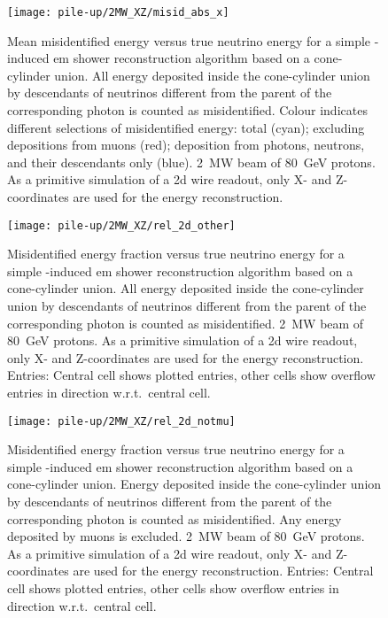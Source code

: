\begin{figure}[tbp]
	\centering
	\texttt{[image: pile-up/2MW\_XZ/misid\_abs\_x]}
	\caption[Pile-up study mean misidentified vs.\ true neutrino energy, \SI{2}{\mega\watt} beam, XZ projection]{%
		Mean misidentified energy versus true neutrino energy for a simple \Pgpz-induced \acrshort{em} shower reconstruction algorithm based on a cone-cylinder union.
		All energy deposited inside the cone-cylinder union by descendants of neutrinos different from the parent of the corresponding \Pgpz photon is counted as misidentified.
		Colour indicates different selections of misidentified energy: total (cyan); excluding depositions from muons (red); deposition from photons, neutrons, and their descendants only (blue).
		\SI{2}{\mega\watt} beam of \SI{80}{\giga\electronvolt} protons.
		As a primitive simulation of a \acrshort{2d} wire readout, only X- and Z-coordinates are used for the energy reconstruction.
	}
\end{figure}

\begin{figure}[tbp]
	\centering
	\texttt{[image: pile-up/2MW\_XZ/rel\_2d\_other]}
	\caption[Pile-up study misidentified fractional vs.\ true neutrino energy, \SI{2}{\mega\watt} beam, XZ projection]{%
		Misidentified energy fraction versus true neutrino energy for a simple \Pgpz-induced \acrshort{em} shower reconstruction algorithm based on a cone-cylinder union.
		All energy deposited inside the cone-cylinder union by descendants of neutrinos different from the parent of the corresponding \Pgpz photon is counted as misidentified.
		\SI{2}{\mega\watt} beam of \SI{80}{\giga\electronvolt} protons.
		As a primitive simulation of a \acrshort{2d} wire readout, only X- and Z-coordinates are used for the energy reconstruction.
		Entries: Central cell shows plotted entries, other cells show overflow entries in direction w.r.t.\ central cell.
	}
\end{figure}

\begin{figure}[tbp]
	\centering
	\texttt{[image: pile-up/2MW\_XZ/rel\_2d\_notmu]}
	\caption[Pile-up study misidentified fractional vs.\ true neutrino energy, no muons, \SI{2}{\mega\watt} beam, XZ projection]{%
		Misidentified energy fraction versus true neutrino energy for a simple \Pgpz-induced \acrshort{em} shower reconstruction algorithm based on a cone-cylinder union.
		Energy deposited inside the cone-cylinder union by descendants of neutrinos different from the parent of the corresponding \Pgpz photon is counted as misidentified.
		Any energy deposited by muons is excluded.
		\SI{2}{\mega\watt} beam of \SI{80}{\giga\electronvolt} protons.
		As a primitive simulation of a \acrshort{2d} wire readout, only X- and Z-coordinates are used for the energy reconstruction.
		Entries: Central cell shows plotted entries, other cells show overflow entries in direction w.r.t.\ central cell.
	}
\end{figure}

